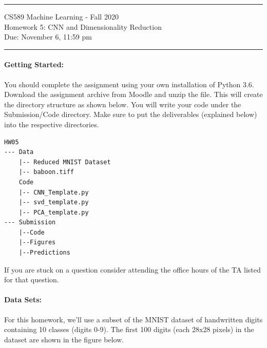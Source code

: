 \documentclass[letterpaper]{article}
\date{Due: November 6, 11:59 pm}
\begin{document}
{\centering
  \rule{6.3in}{2pt}
  \vspace{1em}
  {\Large
    CS589 Machine Learning - Fall 2020 \\
    Homework 5: CNN and Dimensionality Reduction \\
  }
  \vspace{1em}
  Due: November 6, 11:59 pm \\
  \vspace{0.1em}
  \rule{6.3in}{1.5pt}
}
\vspace{1pc}


\paragraph*{Getting Started:} You should complete the assignment using your own installation of Python 3.6. Download the assignment archive from Moodle and unzip the file. This will create the directory structure as shown below. You will write your code under the Submission/Code directory. Make sure to put the deliverables (explained below) into the respective directories.

\begin{verbatim}
HW05
--- Data
    |-- Reduced MNIST Dataset
    |-- baboon.tiff
    Code
    |-- CNN_Template.py
    |-- svd_template.py
    |-- PCA_template.py
--- Submission
    |--Code
    |--Figures    
    |--Predictions
\end{verbatim}

If you are stuck on a question consider attending the office hours of the TA listed for that question.

\paragraph*{Data Sets:} For this homework, we'll use a subset of the MNIST dataset of handwritten digits containing 10 classes (digits 0-9). The first 100 digits (each 28x28 pixels) in the dataset are shown in the figure below.  \vspace{12pt}
\end{document}
